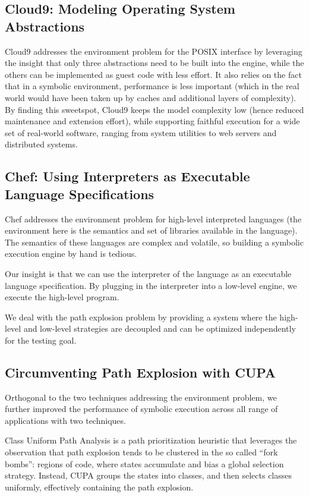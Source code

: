 \subsection{Cloud9: Modeling Operating System Abstractions}

Cloud9 addresses the environment problem for the POSIX interface by leveraging the insight that only three abstractions need to be built into the engine, while the others can be implemented as guest code with less effort.  It also relies on the fact that in a symbolic environment, performance is less important (which in the real world would have been taken up by caches and additional layers of complexity).  By finding this sweetspot, Cloud9 keeps the model complexity low (hence reduced maintenance and extension effort), while supporting faithful execution for a wide set of real-world software, ranging from system utilities to web servers and distributed systems.

\subsection{Chef: Using Interpreters as Executable Language Specifications}

Chef addresses the environment problem for high-level interpreted languages (the environment here is the semantics and set of libraries available in the language).  The semantics of these languages are complex and volatile, so building a symbolic execution engine by hand is tedious.

Our insight is that we can use the interpreter of the language as an executable language specification.  By plugging in the interpreter into a low-level engine, we execute the high-level program.

We deal with the path explosion problem by providing a system where the high-level and low-level strategies are decoupled and can be optimized independently for the testing goal.

\subsection{Circumventing Path Explosion with CUPA}

Orthogonal to the two techniques addressing the environment problem, we further improved the performance of symbolic execution across all range of applications with two techniques.

Class Uniform Path Analysis is a path prioritization heuristic that leverages the observation that path explosion tends to be clustered in the so called ``fork bombs'':  regions of code, where states accumulate and bias a global selection strategy.  Instead, CUPA groups the states into classes, and then selects classes uniformly, effectively containing the path explosion.

